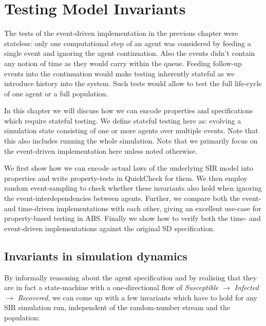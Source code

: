 \chapter{Testing Model Invariants}
\label{ch:sir_invariants}

The tests of the event-driven implementation in the previous chapter were stateless: only one computational step of an agent was considered by feeding a single event and ignoring the agent continuation. Also the events didn't contain any notion of time as they would carry within the queue. Feeding follow-up events into the continuation would make testing inherently stateful as we introduce history into the system. Such tests would allow to test the full life-cycle of one  agent or a full population.

In this chapter we will discuss how we can encode properties and specifications which require stateful testing. We define stateful testing here as: evolving a simulation state consisting of one or more agents over multiple events. Note that this also includes running the whole simulation. Note that we primarily focus on the event-driven implementation here unless noted otherwise.

We first show how we can encode actual laws of the underlying SIR model into properties and write property-tests in QuickCheck for them. We then employ random event-sampling to check whether these invariants also hold when ignoring the event-interdependencies between agents. Further, we compare both the event- and time-driven implementations with each other, giving an excellent use-case for property-based testing in ABS. Finally we show how to verify both the time- and event-driven implementations against the original SD specification.

\section{Invariants in simulation dynamics}
By informally reasoning about the agent specification and by realising that they are in fact a state-machine with a one-directional flow of \textit{Susceptible} $\rightarrow$ \textit{Infected} $\rightarrow$ \textit{Recovered}, we can come up with a few invariants which have to hold for any SIR simulation run, independent of the random-number stream and the population:

